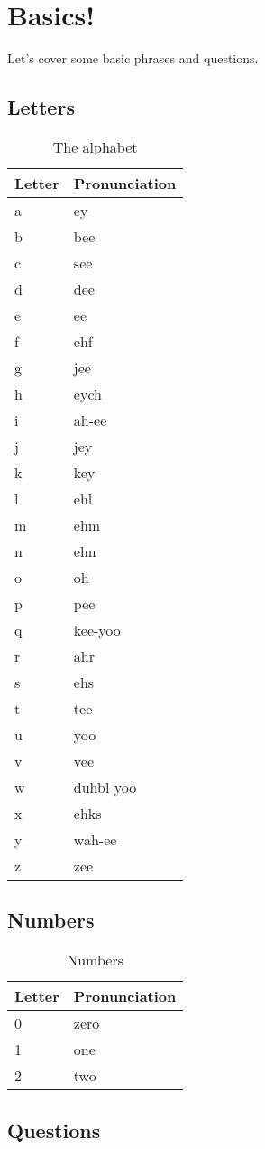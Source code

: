 \chapter{Basics!}

Let's cover some basic phrases and questions.

\section{Letters}

\begin{table}[H]
	\centering
	\begin{tabular}{ll}
	\toprule
	\textbf{Letter} & \textbf{Pronunciation} \\
	\midrule
	a & ey \\
	b & bee \\
	c & see \\
	d & dee \\
	e & ee \\
	f & ehf \\
	g & jee \\
	h & eych \\
	i & ah-ee \\
	j & jey \\
	k & key \\
	l & ehl \\
	m & ehm \\
	n & ehn \\
	o & oh \\
	p & pee \\
	q & kee-yoo \\
	r & ahr \\
	s & ehs \\
	t & tee \\
	u & yoo \\
	v & vee \\
	w & duhbl yoo \\
	x & ehks \\
	y & wah-ee \\
	z & zee \\
	\bottomrule
	\end{tabular}
	\caption{The alphabet}
\end{table}

\section{Numbers}
\begin{table}[H]
	\centering
	\begin{tabular}{ll}
	\toprule
	\textbf{Letter} & \textbf{Pronunciation} \\
	\midrule
	0 & zero \\
	1 & one \\
	2 & two \\

	\bottomrule
	\end{tabular}
	\caption{Numbers}
\end{table}

\section{Questions}


